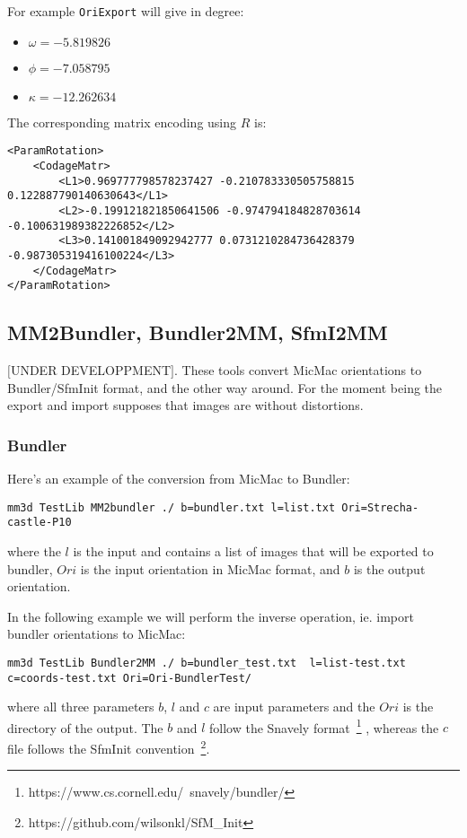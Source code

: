 For example {\tt OriExport} will give in degree:
\newline


\begin{itemize}
\item $\omega=-5.819826$  
\item $\phi=-7.058795$  
\item $\kappa=-12.262634$\newline
\end{itemize}



The corresponding matrix encoding using $R$ is:


\begin{verbatim}
<ParamRotation>
    <CodageMatr>
        <L1>0.969777798578237427 -0.210783330505758815 0.122887790140630643</L1>
        <L2>-0.199121821850641506 -0.974794184828703614 -0.100631989382226852</L2>
        <L3>0.141001849092942777 0.0731210284736428379 -0.987305319416100224</L3>
	</CodageMatr>
</ParamRotation>
\end{verbatim}


\subsection{MM2Bundler, Bundler2MM, SfmI2MM}
$[$UNDER DEVELOPPMENT$]$. These tools convert MicMac orientations to Bundler/SfmInit format, and the other way around. For the moment being the export and import supposes that images are without distortions. \par

\subsubsection*{Bundler}
Here's an example of the conversion from MicMac to Bundler:
\begin{verbatim}
mm3d TestLib MM2bundler ./ b=bundler.txt l=list.txt Ori=Strecha-castle-P10
\end{verbatim}
%
where the $l$ is the input and contains a list of images that will be exported to bundler, $Ori$ is the input orientation in MicMac format, and $b$ is the output orientation.\par

In the following example we will perform the inverse operation, ie. import bundler orientations to MicMac:
\begin{verbatim}
mm3d TestLib Bundler2MM ./ b=bundler_test.txt  l=list-test.txt c=coords-test.txt Ori=Ori-BundlerTest/
\end{verbatim}
where all three parameters $b$, $l$ and $c$ are input parameters and the $Ori$ is the directory of the output. The $b$ and $l$ follow the Snavely format~\footnote{https://www.cs.cornell.edu/~snavely/bundler/} , whereas the $c$ file follows the SfmInit convention~\footnote{\label{note:sfmi}https://github.com/wilsonkl/SfM\_Init}.
%
